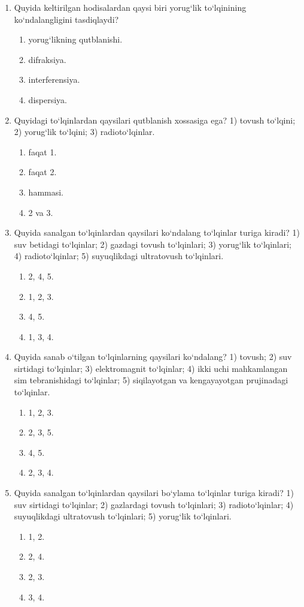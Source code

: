 \begin{enumerate}
\item Quyida keltirilgan hodisalardan qaysi biri yorug‘lik to‘lqinining ko‘ndalangligini tasdiqlaydi?
\begin{enumerate}[label=\Alph*)]
\item yorug‘likning qutblanishi.
\item difraksiya.
\item interferensiya.
\item dispersiya.
\end{enumerate}

\item Quyidagi to‘lqinlardan qaysilari qutblanish xossasiga ega?
1) tovush to‘lqini; 2) yorug‘lik to‘lqini; 3) radioto‘lqinlar.
\begin{enumerate}[label=\Alph*)]
\item faqat 1.
\item faqat 2.
\item hammasi.
\item 2 va 3.
\end{enumerate}

\item Quyida sanalgan to‘lqinlardan qaysilari ko‘ndalang to‘lqinlar turiga kiradi?
1) suv betidagi to‘lqinlar; 2) gazdagi tovush to‘lqinlari; 3) yorug‘lik to‘lqinlari; 4) radioto‘lqinlar; 5) suyuqlikdagi ultratovush to‘lqinlari.
\begin{enumerate}[label=\Alph*)]
\item 2, 4, 5.
\item 1, 2, 3.
\item 4, 5.
\item 1, 3, 4.
\end{enumerate}

\item Quyida sanab o‘tilgan to‘lqinlarning qaysilari ko‘ndalang?
1) tovush; 2) suv sirtidagi to‘lqinlar; 3) elektromagnit to‘lqinlar; 4) ikki uchi mahkamlangan sim tebranishidagi to‘lqinlar; 5) siqilayotgan va kengayayotgan prujinadagi to‘lqinlar.
\begin{enumerate}[label=\Alph*)]
\item 1, 2, 3.
\item 2, 3, 5.
\item 4, 5.
\item 2, 3, 4.
\end{enumerate}

\item Quyida sanalgan to‘lqinlardan qaysilari bo‘ylama to‘lqinlar turiga kiradi?
1) suv sirtidagi to‘lqinlar; 2) gazlardagi tovush to‘lqinlari; 3) radioto‘lqinlar; 4) suyuqlikdagi ultratovush to‘lqinlari; 5) yorug‘lik to‘lqinlari.
\begin{enumerate}[label=\Alph*)]
\item 1, 2.
\item 2, 4.
\item 2, 3.
\item 3, 4.
\end{enumerate}


\end{enumerate}
